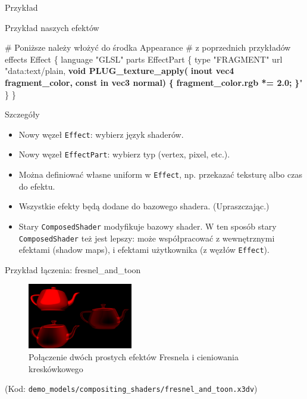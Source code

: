 \documentclass{beamer}
\begin{document}
\begin{frame}[fragile]{Przykład}
\begin{exampleblock}{Przykład naszych efektów}
\begin{semiverbatim}
# Poniższe należy włożyć do środka Appearance
# z poprzednich przykładów
effects Effect \{
  language "GLSL"
  parts EffectPart \{
    type "FRAGMENT"
    url "data:text/plain,
\textbf{    void PLUG\_texture\_apply(}
\textbf{      inout vec4 fragment\_color,}
\textbf{      const in vec3 normal)}
\textbf{    \{}
\textbf{      fragment\_color.rgb *= 2.0;}
\textbf{    \}}"
  \}
\}
\end{semiverbatim}
\end{exampleblock}
\end{frame}

\begin{frame}{Szczegóły}
\begin{itemize}
  \item Nowy węzeł \texttt{Effect}: wybierz język shaderów.
  \item Nowy węzeł \texttt{EffectPart}: wybierz typ (vertex, pixel, etc.).
  \item Można definiować własne uniform w \texttt{Effect}, np. przekazać
    teksturę albo czas do efektu.
  \item Wszystkie efekty będą dodane do bazowego shadera. (Upraszczając.)
  \item Stary \texttt{ComposedShader} modyfikuje bazowy shader.
    W ten sposób stary \texttt{ComposedShader} też jest lepszy:
    może współpracować z wewnętrznymi efektami (shadow maps),
    i efektami użytkownika (z węzłów \texttt{Effect}).
\end{itemize}
\end{frame}

\begin{frame}{Przykład łączenia: fresnel\_and\_toon}
\begin{figure}
  \centering
  \includegraphics[width=1.8in]{../fresnel_and_toon}
  \caption{Połączenie dwóch prostych efektów Fresnela i cieniowania kreskówkowego}
\end{figure}

(Kod: \texttt{demo\_models/compositing\_shaders/fresnel\_and\_toon.x3dv})

\end{frame}
\end{document}
